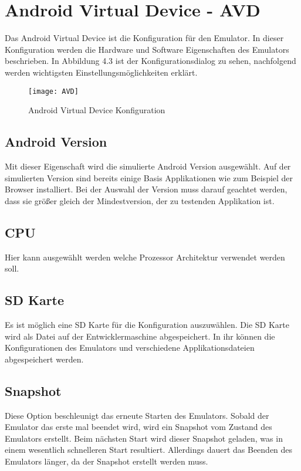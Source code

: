 \section{Android Virtual Device - AVD}
Das Android Virtual Device ist die Konfiguration für den Emulator. In dieser Konfiguration werden die Hardware und Software Eigenschaften des Emulators beschrieben. In Abbildung 4.3 ist der Konfigurationsdialog zu sehen, nachfolgend werden wichtigsten Einstellungsmöglichkeiten erklärt.\cite{44}\cite{45}

\begin{figure}
\centering
\texttt{[image: AVD]}
\caption{Android Virtual Device Konfiguration}
\label{fig:AVD}
\end{figure}

\subsection{Android Version}
Mit dieser Eigenschaft wird die simulierte Android Version ausgewählt. Auf der simulierten Version sind bereits einige Basis Applikationen wie zum Beispiel der Browser installiert. Bei der Auswahl der Version muss darauf geachtet werden, dass sie größer gleich der Mindestversion, der zu testenden Applikation ist.\cite{45}

\subsection{CPU}
Hier kann ausgewählt werden welche Prozessor Architektur verwendet werden soll.\cite{45}

\subsection{SD Karte}
Es ist möglich eine SD Karte für die Konfiguration auszuwählen. Die SD Karte wird als Datei auf der Entwicklermaschine abgespeichert. In ihr können die Konfigurationen des Emulators und verschiedene Applikationsdateien abgespeichert werden.\cite{45}

\subsection{Snapshot}
Diese Option beschleunigt das erneute Starten des Emulators. Sobald der Emulator das erste mal beendet wird, wird ein Snapshot vom Zustand des Emulators erstellt. Beim nächsten Start wird dieser Snapshot geladen, was in einem wesentlich schnelleren Start resultiert. Allerdings dauert das Beenden des Emulators länger, da der Snapshot erstellt werden muss.\cite{45}

